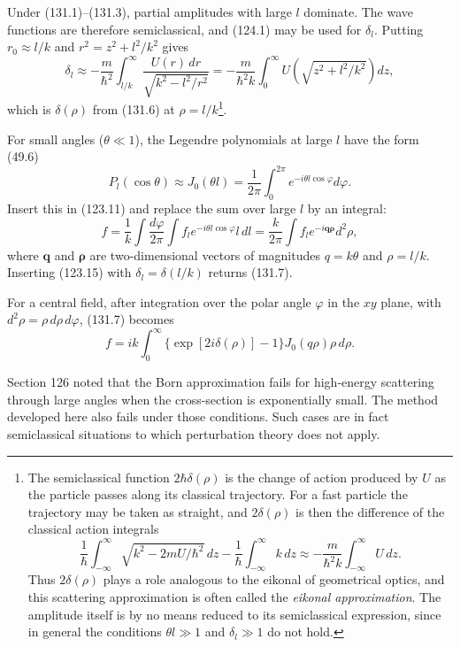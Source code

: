 Under (131.1)--(131.3), partial amplitudes with large $l$ dominate. The wave
functions are therefore semiclassical, and (124.1) may be used for $\delta_l$.
Putting $r_0\approx l/k$ and $r^2=z^2+l^2/k^2$ gives
\[
 \delta_l\approx-\frac{m}{\hbar^2}\int_{l/k}^{\infty}
 \frac{U(r)\,dr}{\sqrt{k^2-l^2/r^2}}
 =-\frac{m}{\hbar^2k}\int_0^\infty
 U\left(\sqrt{z^2+l^2/k^2}\right)dz,
\]
which is $\delta(\rho)$ from (131.6) at $\rho=l/k$\footnote{The semiclassical
function $2\hbar\delta(\rho)$ is the change of action produced by $U$ as the
particle passes along its classical trajectory. For a fast particle the
trajectory may be taken as straight, and $2\delta(\rho)$ is then the difference
of the classical action integrals
\[
 \frac1\hbar\int_{-\infty}^{\infty}\sqrt{k^2-2mU/\hbar^2}\,dz
 -\frac1\hbar\int_{-\infty}^{\infty}k\,dz
 \approx-\frac{m}{\hbar^2k}\int_{-\infty}^{\infty}U\,dz.
\]
Thus $2\delta(\rho)$ plays a role analogous to the eikonal of geometrical
optics, and this scattering approximation is often called the \emph{eikonal
approximation}. The amplitude itself is by no means reduced to its
semiclassical expression, since in general the conditions $\theta l\gg1$ and
$\delta_l\gg1$ do not hold.}.

For small angles ($\theta\ll1$), the Legendre polynomials at large $l$ have the
form (49.6)
\[
 P_l(\cos\theta)\approx J_0(\theta l)
 =\frac1{2\pi}\int_0^{2\pi}e^{-i\theta l\cos\varphi}d\varphi.
\]
Insert this in (123.11) and replace the sum over large $l$ by an integral:
\begin{equation}
 f=\frac1k\int\frac{d\varphi}{2\pi}
 \int f_l e^{-i\theta l\cos\varphi}l\,dl
 =\frac{k}{2\pi}\int f_l e^{-i\mathbf{q\rho}}d^2\rho,
 \tag{131.9}
\end{equation}
where $\mathbf q$ and $\boldsymbol\rho$ are two-dimensional vectors of
magnitudes $q=k\theta$ and $\rho=l/k$. Inserting (123.15) with
$\delta_l=\delta(l/k)$ returns (131.7).

For a central field, after integration over the polar angle $\varphi$ in the
$xy$ plane, with $d^2\rho=\rho\,d\rho\,d\varphi$, (131.7) becomes
\begin{equation}
 f=ik\int_0^\infty\{\exp[2i\delta(\rho)]-1\}
 J_0(q\rho)\rho\,d\rho.
 \tag{131.10}
\end{equation}

Section 126 noted that the Born approximation fails for high-energy scattering
through large angles when the cross-section is exponentially small. The method
developed here also fails under those conditions. Such cases are in fact
semiclassical situations to which perturbation theory does not apply.

